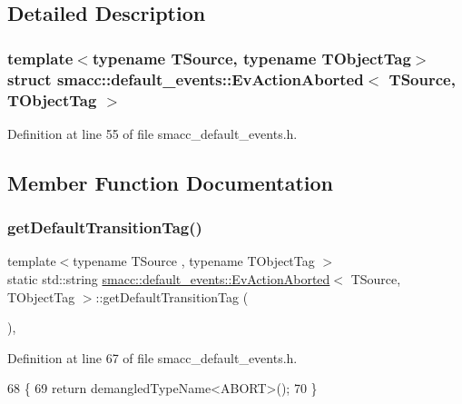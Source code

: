 \subsection{Detailed Description}
\subsubsection*{template$<$typename T\+Source, typename T\+Object\+Tag$>$\newline
struct smacc\+::default\+\_\+events\+::\+Ev\+Action\+Aborted$<$ T\+Source, T\+Object\+Tag $>$}



Definition at line 55 of file smacc\+\_\+default\+\_\+events.\+h.



\subsection{Member Function Documentation}
\mbox{\label{structsmacc_1_1default__events_1_1EvActionAborted_ad31e4437f0d30bf59589c28590a1edaa}} 
\subsubsection{\texorpdfstring{get\+Default\+Transition\+Tag()}{getDefaultTransitionTag()}}
{\footnotesize\ttfamily template$<$typename T\+Source , typename T\+Object\+Tag $>$ \\
static std\+::string \hyperlink{structsmacc_1_1default__events_1_1EvActionAborted}{smacc\+::default\+\_\+events\+::\+Ev\+Action\+Aborted}$<$ T\+Source, T\+Object\+Tag $>$\+::get\+Default\+Transition\+Tag (\begin{DoxyParamCaption}{ }\end{DoxyParamCaption})\hspace{0.3cm}{\ttfamily [inline]}, {\ttfamily [static]}}



Definition at line 67 of file smacc\+\_\+default\+\_\+events.\+h.


\begin{DoxyCode}
68   \{
69     \textcolor{keywordflow}{return} demangledTypeName<ABORT>();
70   \}
\end{DoxyCode}
\mbox{\label{structsmacc_1_1default__events_1_1EvActionAborted_abb8137180081b5cce72398b81cc95fc5}} 
